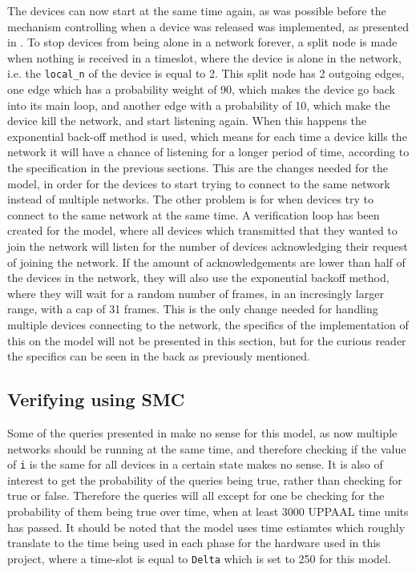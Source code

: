 The devices can now start at the same time again, as was possible before the mechanism controlling when a device was released was implemented, as presented in .
To stop devices from being alone in a network forever, a split node is made when nothing is received in a timeslot, where the device is alone in the network, i.e. the \texttt{local\_n} of the device is equal to 2.
This split node has 2 outgoing edges, one edge which has a probability weight of 90, which makes the device go back into its main loop, and another edge with a probability of 10, which make the device kill the network, and start listening again.
When this happens the exponential back-off method is used, which means for each time a device kills the network it will have a chance of listening for a longer period of time, according to the specification in the previous sections.
This are the changes needed for the model, in order for the devices to start trying to connect to the same network instead of multiple networks.
The other problem is for when devices try to connect to the same network at the same time.
A verification loop has been created for the model, where all devices which transmitted that they wanted to join the network will listen for the number of devices acknowledging their request of joining the network.
If the amount of acknowledgements are lower than half of the devices in the network, they will also use the exponential backoff method, where they will wait for a random number of frames, in an incresingly larger range, with a cap of 31 frames.
This is the only change needed for handling multiple devices connecting to the network, the specifics of the implementation of this on the model will not be presented in this section, but for the curious reader the specifics can be seen in the back as previously mentioned. 


\subsection*{Verifying using SMC}

Some of the queries presented in  make no sense for this model, as now multiple networks should be running at the same time, and therefore checking if the value of \texttt{i} is the same for all devices in a certain state makes no sense.
It is also of interest to get the probability of the queries being true, rather than checking for true or false.
Therefore the queries will all except for one be checking for the probability of them being true over time, when at least 3000 UPPAAL time units has passed.
It should be noted that the model uses time estiamtes which roughly translate to the time being used in each phase for the hardware used in this project, where a time-slot is equal to \texttt{Delta} which is set to 250 for this model.

